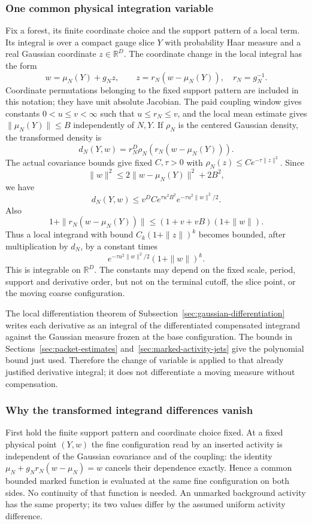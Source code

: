 \subsubsection{One common physical integration variable}
Fix a forest, its finite coordinate choice and the support pattern
of a local term. Its integral is over a compact gauge slice $Y$
with probability Haar measure and a real Gaussian coordinate
$z\in\mathbb R^D$. The coordinate change in the local integral
has the form
\[
                     w=\mu_N(Y)+g_N z,\qquad
                     z=r_N(w-\mu_N(Y)),\quad r_N=g_N^{-1}.
\]
Coordinate permutations belonging to the fixed support pattern
are included in this notation; they have unit absolute Jacobian.
The paid coupling window gives constants $0<u\le v<\infty$
such that $u\le r_N\le v$, and the local mean estimate gives
$\|\mu_N(Y)\|\le B$ independently of $N,Y$. If $\rho_N$ is
the centered Gaussian density, the transformed density is
\[
             d_N(Y,w)=r_N^D\rho_N(r_N(w-\mu_N(Y))).
\]
The actual covariance bounds give fixed $C,\tau>0$ with
$\rho_N(z)\le C e^{-\tau\|z\|^2}$. Since
\[
 \|w\|^2\le2\|w-\mu_N(Y)\|^2+2B^2,
\]
we have
\begin{equation}
 d_N(Y,w)\le v^DCe^{\tau u^2B^2}
                              e^{-\tau u^2\|w\|^2/2}.
\label{eq:marked-common-gaussian-envelope}
\end{equation}
Also
\[
 1+\|r_N(w-\mu_N(Y))\|
                  \le(1+v+vB)(1+\|w\|).
\]
Thus a local integrand with bound $C_k(1+\|z\|)^k$ becomes
bounded, after multiplication by $d_N$, by a constant times
\[
                  e^{-\tau u^2\|w\|^2/2}(1+\|w\|)^k.
\]
This is integrable on $\mathbb R^D$. The constants may depend
on the fixed scale, period, support and derivative order, but
not on the terminal cutoff, the slice point, or the moving
coarse configuration.

The local differentiation theorem of
Subsection~\ref{sec:gaussian-differentiation} writes each derivative
as an integral of the differentiated compensated integrand
against the Gaussian measure frozen at the base configuration.
The bounds in Sections~\ref{sec:packet-estimates}
and~\ref{sec:marked-activity-jets} give the polynomial bound
just used. Therefore the change of variable is applied to that
already justified derivative integral; it does not differentiate
a moving measure without compensation.

\subsubsection{Why the transformed integrand differences vanish}
First hold the finite support pattern and coordinate choice fixed.
At a fixed physical point $(Y,w)$ the fine configuration read by
an inserted activity is independent of the Gaussian covariance
and of the coupling: the identity
$\mu_N+g_Nr_N(w-\mu_N)=w$ cancels their dependence exactly.
Hence a common bounded marked function is evaluated at the same
fine configuration on both sides. No continuity of that function
is needed. An unmarked background activity has the same property;
its two values differ by the assumed uniform activity difference.

